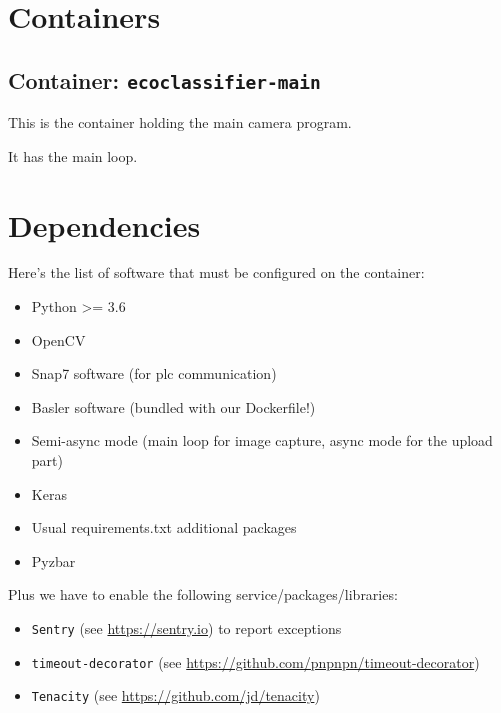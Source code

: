 \section{Containers}


\subsection{Container: \texttt{ecoclassifier-main}}

This is the container holding the main camera program.

It has the main loop.



\section{Dependencies}


Here's the list of software that must be configured on the container:

\begin{itemize}
    \item Python >= 3.6
    \item OpenCV
    \item Snap7 software (for \gls{plc} communication)
    \item Basler software (bundled with our Dockerfile!)
    \item Semi-async mode (main loop for image capture, async mode for the upload part)
    \item Keras
    \item Usual requirements.txt additional packages
    \item Pyzbar
\end{itemize}

Plus we have to enable the following service/packages/libraries:

\begin{itemize}
    \item \texttt{Sentry} (see \url{https://sentry.io}) to report exceptions
    \item \texttt{timeout-decorator} (see \url{https://github.com/pnpnpn/timeout-decorator})
    \item \texttt{Tenacity} (see \url{https://github.com/jd/tenacity})
\end{itemize}
